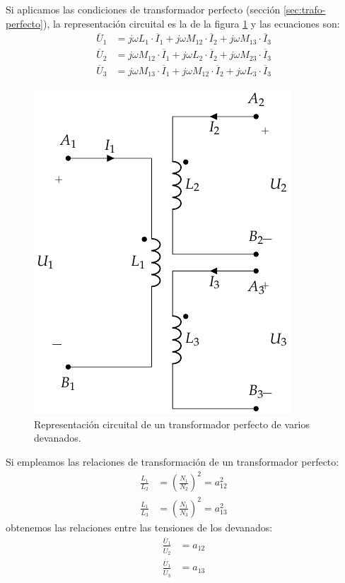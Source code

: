 Si aplicamos las condiciones de transformador perfecto (sección \ref{sec:trafo-perfecto}), la representación circuital es la de la figura \ref{fig:trafo-perfecto-varios-devanados} y las ecuaciones son:
  \begin{align*}
  \overline{U}_1 &= j \omega L_1 \cdot \overline{I}_1 + j \omega M_{12} \cdot\overline{I}_2 + j \omega M_{13} \cdot\overline{I}_3\\
  \overline{U}_2 &= j \omega M_{12} \cdot \overline{I}_1 + j \omega L_2 \cdot \overline{I}_2 + j \omega M_{23} \cdot \overline{I}_3\\
  \overline{U}_3 &= j \omega M_{13} \cdot \overline{I}_1 + j \omega M_{12} \cdot\overline{I}_2 + j \omega L_3 \cdot \overline{I}_3
\end{align*}

\begin{figure}
  \centering
  \includegraphics[height=0.25\textheight]{../figs/TrafoPerfectoVariosDevanados.pdf}
  \caption{Representación circuital de un transformador perfecto de varios devanados.}
  \label{fig:trafo-perfecto-varios-devanados}
\end{figure}

Si empleamos las relaciones de transformación de un transformador perfecto:
      \begin{align*}
  \frac{L_1}{L_2} &= \left(\frac{N_1}{N_2}\right)^2 = a^2_{12}\\
  \frac{L_1}{L_3} &= \left(\frac{N_1}{N_3}\right)^2 = a^2_{13}
\end{align*}
obtenemos las relaciones entre las tensiones de los devanados:
\begin{align}
  \frac{\overline{U}_1}{\overline{U}_2} &= a_{12}\\
  \frac{\overline{U}_1}{\overline{U}_3} &= a_{13}\label{eq:trafo-ideal-varios-devanados-tensiones}
\end{align}


